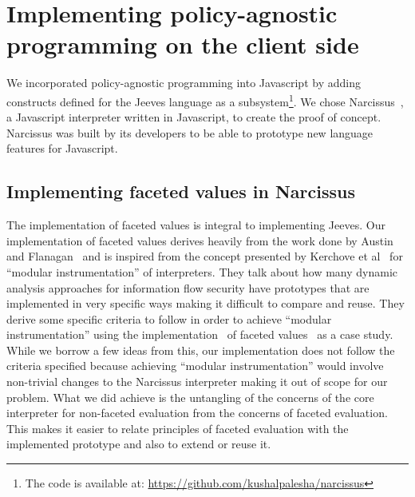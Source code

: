 \chapter{Implementing policy-agnostic programming on the client side\label{chap:solution}}
We incorporated policy-agnostic programming into Javascript by adding constructs
defined for the Jeeves language as a subsystem\footnote{The code is available at:
\url{https://github.com/kushalpalesha/narcissus}}. We chose Narcissus~\cite{narc},
a Javascript interpreter written in Javascript, to create the proof of concept.
Narcissus was built by its developers to be able to prototype new language features
for Javascript.

\section{Implementing faceted values in Narcissus}
The implementation of faceted values is integral to implementing Jeeves. Our implementation
of faceted values derives heavily from the work done by Austin and Flanagan~\cite{Faceted}
and is inspired from the concept presented by Kerchove et al~\cite{Modular} for
``modular instrumentation'' of interpreters. They talk about how many dynamic analysis
approaches for information flow security have prototypes that are implemented in
very specific ways making it difficult to compare and reuse. They derive some
specific criteria to follow in order to achieve ``modular instrumentation'' using
the implementation~\cite{ZaphodFacets} of faceted values~\cite{Faceted} as a case
study. While we borrow a few ideas from this, our implementation does not follow
the criteria specified because achieving ``modular instrumentation'' would involve
non-trivial changes to the Narcissus interpreter making it out of scope for our problem.
What we did achieve is the untangling of the concerns of the core interpreter for
non-faceted evaluation from the concerns of faceted evaluation. This makes it easier
to relate principles of faceted evaluation with the implemented prototype and also
to extend or reuse it.

